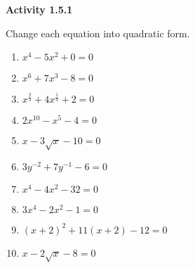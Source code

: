 \vspace{1ex}
\noindent\textbf{Activity 1.5.1}

\vspace{0.75ex}
Change each equation into quadratic form. 
\begin{multicols}{2}
\begin{enumerate}[label = \color{blue}\arabic*. ]
   \item $ x^{4} - 5x^{2} + 0 = 0 $
   \item $ x^{6} + 7x^{3} - 8 = 0 $
   \item $ x^{\tfrac{2}{3}} + 4x^{\tfrac{1}{3}} + 2 = 0 $
   \item $ 2x^{10} - x^{5} - 4 = 0 $
   \item $ x - 3\sqrt{x} - 10 = 0 $
   \item $ 3y^{-2} + 7y^{-1} - 6 = 0 $
   \item $ x^{4} - 4x^{2} - 32 = 0 $
   \item $ 3x^{4} - 2x^{2} - 1 = 0 $
   \item $ (x+2)^{2} + 11(x+2) - 12 = 0 $
   \item $ x - 2\sqrt{x} - 8 = 0 $
\end{enumerate}
\end{multicols} 



